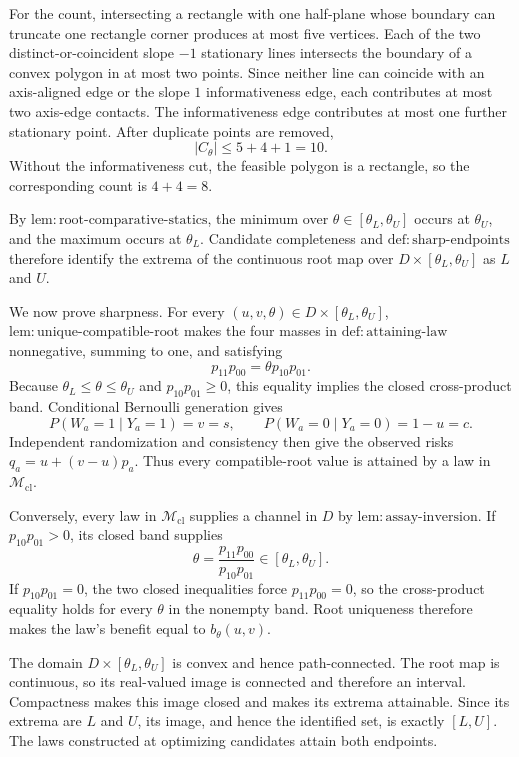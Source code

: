 For the count, intersecting a rectangle with one half-plane whose boundary can truncate one rectangle corner produces at most five vertices. Each of the two distinct-or-coincident slope \(-1\) stationary lines intersects the boundary of a convex polygon in at most two points. Since neither line can coincide with an axis-aligned edge or the slope \(1\) informativeness edge, each contributes at most two axis-edge contacts. The informativeness edge contributes at most one further stationary point. After duplicate points are removed,
\[
|C_\theta|\leq5+4+1=10.
\]
Without the informativeness cut, the feasible polygon is a rectangle, so the corresponding count is \(4+4=8\).

By \(\mathrm{lem:root\text{-}comparative\text{-}statics}\), the minimum over \(\theta\in[\theta_L,\theta_U]\) occurs at \(\theta_U\), and the maximum occurs at \(\theta_L\). Candidate completeness and \(\mathrm{def:sharp\text{-}endpoints}\) therefore identify the extrema of the continuous root map over \(D\times[\theta_L,\theta_U]\) as \(L\) and \(U\).

We now prove sharpness. For every \((u,v,\theta)\in D\times[\theta_L,\theta_U]\), \(\mathrm{lem:unique\text{-}compatible\text{-}root}\) makes the four masses in \(\mathrm{def:attaining\text{-}law}\) nonnegative, summing to one, and satisfying
\[
p_{11}p_{00}=\theta p_{10}p_{01}.
\]
Because \(\theta_L\leq\theta\leq\theta_U\) and \(p_{10}p_{01}\geq0\), this equality implies the closed cross-product band. Conditional Bernoulli generation gives
\[
P(W_a=1\mid Y_a=1)=v=s,
\qquad
P(W_a=0\mid Y_a=0)=1-u=c.
\]
Independent randomization and consistency then give the observed risks \(q_a=u+(v-u)p_a\). Thus every compatible-root value is attained by a law in \(\mathcal M_{\mathrm{cl}}\).

Conversely, every law in \(\mathcal M_{\mathrm{cl}}\) supplies a channel in \(D\) by \(\mathrm{lem:assay\text{-}inversion}\). If \(p_{10}p_{01}>0\), its closed band supplies
\[
\theta=\frac{p_{11}p_{00}}{p_{10}p_{01}}
\in[\theta_L,\theta_U].
\]
If \(p_{10}p_{01}=0\), the two closed inequalities force \(p_{11}p_{00}=0\), so the cross-product equality holds for every \(\theta\) in the nonempty band. Root uniqueness therefore makes the law's benefit equal to \(b_\theta(u,v)\).

The domain \(D\times[\theta_L,\theta_U]\) is convex and hence path-connected. The root map is continuous, so its real-valued image is connected and therefore an interval. Compactness makes this image closed and makes its extrema attainable. Since its extrema are \(L\) and \(U\), its image, and hence the identified set, is exactly \([L,U]\). The laws constructed at optimizing candidates attain both endpoints.

